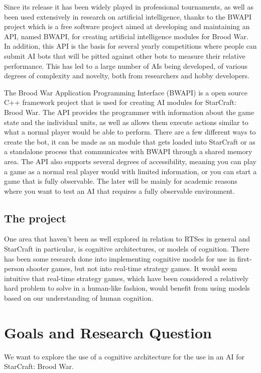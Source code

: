 Since its release it has been widely played in professional tournaments, as well
as been used extensively in research on artificial intelligence, thanks to the
BWAPI project which is a free software project aimed at developing and
maintaining an API, named BWAPI, for creating artificial intelligence modules
for Brood War. In addition, this API is the basis for several yearly
competitions where people can submit AI bots that will be pitted against other
bots to measure their relative performance. This has led to a large number of
AIs being developed, of various degrees of complexity and novelty, both from
researchers and hobby developers. 

The Brood War Application Programming Interface (BWAPI) is a open source C++
framework project that is used for creating AI modules for StarCraft: Brood War.
The API provides the programmer with information about the game state and the
individual units, as well as allows them execute actions similar to what a
normal player would be able to perform. There are a few different ways to create
the bot, it can be made as an module that gets loaded into StarCraft or as a
standalone process that communicates with BWAPI through a shared memory area.
The API also supports several degrees of accessibility, meaning you can play a
game as a normal real player would with limited information, or you can start a
game that is fully observable. The later will be mainly for academic reasons
where you want to test an AI that requires a fully observable environment.  

\subsection{The project}
One area that haven't been as well explored in relation to RTSes in general and
StarCraft in particular, is cognitive architectures, or models of cognition.
There has been some research done into implementing cognitive models for use in
first-person shooter games, but not into real-time strategy games. It would seem
intuitive that real-time strategy games, which have been considered a relatively
hard problem to solve in a human-like fashion, would benefit from using models
based on our understanding of human cognition.

\section{Goals and Research Question}
We want to explore the use of a cognitive architecture for the use in an AI for
StarCraft: Brood War.

